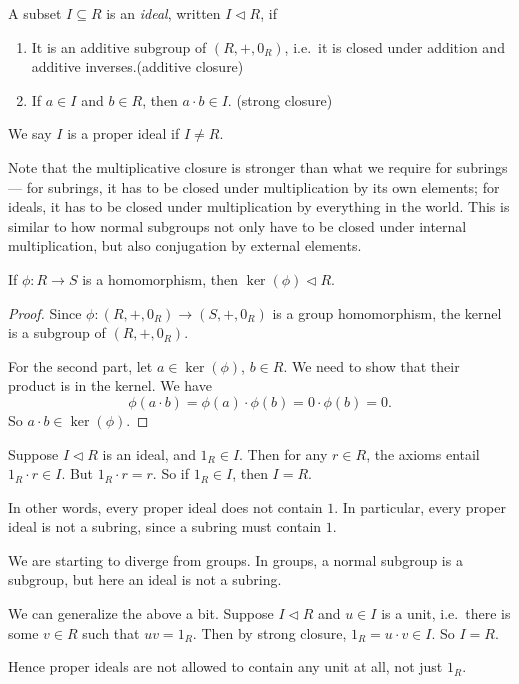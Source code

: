 \documentclass[a4paper]{article}
\begin{document}
\begin{defi}[Ideal]
  A subset $I \subseteq R$ is an \emph{ideal}, written $I \lhd R$, if
  \begin{enumerate}
    \item It is an additive subgroup of $(R, +, 0_R)$, i.e.\ it is closed under addition and additive inverses.\hfill (additive closure)
    \item If $a \in I$ and $b \in R$, then $a \cdot b \in I$. \hfill (strong closure)
  \end{enumerate}
  We say $I$ is a proper ideal if $I \not= R$.
\end{defi}
Note that the multiplicative closure is stronger than what we require for subrings --- for subrings, it has to be closed under multiplication by its own elements; for ideals, it has to be closed under multiplication by everything in the world. This is similar to how normal subgroups not only have to be closed under internal multiplication, but also conjugation by external elements.

\begin{lemma}
  If $\phi: R \to S$ is a homomorphism, then $\ker(\phi)\lhd R$.
\end{lemma}

\begin{proof}
  Since $\phi: (R, +, 0_R) \to (S, +, 0_R)$ is a group homomorphism, the kernel is a subgroup of $(R, +, 0_R)$.

  For the second part, let $a \in \ker(\phi)$, $b \in R$. We need to show that their product is in the kernel. We have
  \[
    \phi(a\cdot b) = \phi(a) \cdot \phi(b) = 0 \cdot \phi(b) = 0.
  \]
  So $a \cdot b \in \ker(\phi)$.
\end{proof}

\begin{eg}
  Suppose $I \lhd R$ is an ideal, and $1_R \in I$. Then for any $r \in R$, the axioms entail $1_R \cdot r \in I$. But $1_R \cdot r = r$. So if $1_R \in I$, then $I = R$.

  In other words, every proper ideal does not contain $1$. In particular, every proper ideal is not a subring, since a subring must contain $1$.
\end{eg}
We are starting to diverge from groups. In groups, a normal subgroup is a subgroup, but here an ideal is not a subring.

\begin{eg}
  We can generalize the above a bit. Suppose $I \lhd R$ and $u \in I$ is a unit, i.e.\ there is some $v \in R$ such that $uv = 1_R$. Then by strong closure, $1_R = u \cdot v\in I$. So $I = R$.

  Hence proper ideals are not allowed to contain any unit at all, not just $1_R$.
\end{eg}
\end{document}
